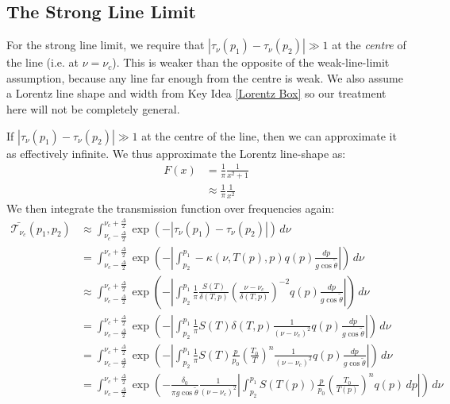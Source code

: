 \subsection{The Strong Line Limit}

For the strong line limit, we require that $|\tau_\nu(p_1)-\tau_\nu(p_2)|\gg 1$ at the \textit{centre} of the line (i.e. at $\nu=\nu_c$). This is weaker than the opposite of the weak-line-limit assumption, because any line far enough from the centre is weak. We also assume a Lorentz line shape and width from Key Idea \ref{Lorentz Box} so our treatment here will not be completely general.

If $|\tau_\nu(p_1)-\tau_\nu(p_2)|\gg 1$ at the centre of the line, then we can approximate it as effectively infinite. We thus approximate the Lorentz line-shape as:
\begin{align*}
    F(x)&=\frac{1}{\pi}\frac{1}{x^2+1}\\
    &\approx \frac{1}{\pi}\frac{1}{x^2}
\end{align*}
We then integrate the transmission function over frequencies again:
\begin{align*}
    \bar{\mathcal{T}_{\nu_c}}(p_1,p_2)&\approx\int_{\nu_c-\frac{\Delta}{2}}^{\nu_c+\frac{\Delta}{2}} \exp(-|\tau_\nu(p_1)-\tau_\nu(p_2)|)\,d\nu\\
    &=\int_{\nu_c-\frac{\Delta}{2}}^{\nu_c+\frac{\Delta}{2}} \exp\left(
        -\left|
            \int_{p_2}^{p_1}-\kappa(\nu,T(p),p)q(p)\frac{dp}{g\cos\tilde{\theta}}
        \right|
    \right)\,d\nu\\
    &\approx\int_{\nu_c-\frac{\Delta}{2}}^{\nu_c+\frac{\Delta}{2}} \exp\left(
        -\left|
            \int_{p_2}^{p_1}\frac{1}{\pi}\frac{S(T)}{\delta(T,p)}\left( \frac{\nu-\nu_c}{\delta(T,p)} \right)^{-2}q(p)\frac{dp}{g\cos\tilde{\theta}}
        \right|
    \right)\,d\nu\\
    &=\int_{\nu_c-\frac{\Delta}{2}}^{\nu_c+\frac{\Delta}{2}} \exp\left(
        -\left|
            \int_{p_2}^{p_1}\frac{1}{\pi}S(T)\delta(T,p) \frac{1}{(\nu-\nu_c)^2}q(p)\frac{dp}{g\cos\tilde{\theta}}
        \right|
    \right)\,d\nu\\
    &=\int_{\nu_c-\frac{\Delta}{2}}^{\nu_c+\frac{\Delta}{2}} \exp\left(
        -\left|
            \int_{p_2}^{p_1}\frac{1}{\pi}S(T) \frac{p}{p_0} \left( \frac{T_0}{T} \right)^n \frac{1}{(\nu-\nu_c)^2}q(p)\frac{dp}{g\cos\tilde{\theta}}
        \right|
    \right)\,d\nu\\
    &=\int_{\nu_c-\frac{\Delta}{2}}^{\nu_c+\frac{\Delta}{2}} \exp\left(
        -\frac{\delta_0}{\pi g \cos \tilde{\theta}}\frac{1}{(\nu-\nu_c)^2}
        \left|
            \int_{p_2}^{p_1}S(T(p))\frac{p}{p_0} \left( \frac{T_0}{T(p)} \right)^n q(p)\,dp
        \right|
    \right)\,d\nu
\end{align*}
